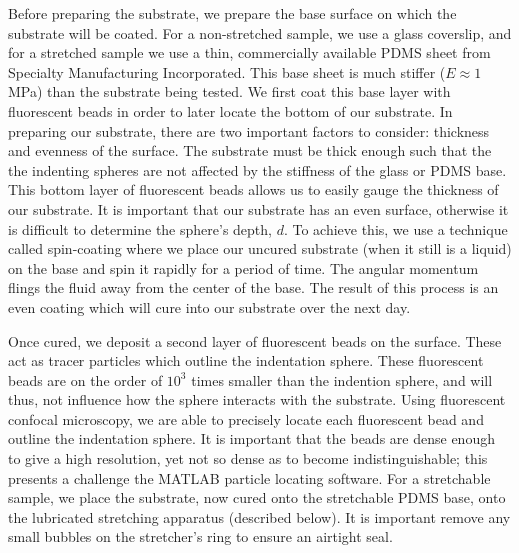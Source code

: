 Before preparing the substrate, we prepare the base surface on which the substrate will be coated. For a non-stretched sample, we use a glass coverslip, and for a stretched sample we use a thin, commercially available PDMS sheet from Specialty Manufacturing Incorporated. This base sheet is much stiffer ($ E\approx 1 $ MPa) than the substrate being tested. We first coat this base layer with fluorescent beads in order to later locate the bottom of our substrate. In preparing our substrate, there are two important factors to consider: thickness and evenness of the surface. The substrate must be thick enough such that the the indenting spheres are not affected by the stiffness of the glass or PDMS base. This bottom layer of fluorescent beads allows us to easily gauge the thickness of our substrate. It is important that our substrate has an even surface, otherwise it is difficult to determine the sphere's depth, $ d $. To achieve this, we use a technique called spin-coating where we place our uncured substrate (when it still is a liquid) on the base and spin it rapidly for a period of time. The angular momentum  flings the fluid away from the center of the base. The result of this process is an even coating which will cure into our substrate over the next day.

Once cured, we deposit a second layer of fluorescent beads on the surface. These act as tracer particles which outline the indentation sphere. These fluorescent beads are on the order of $ 10^3 $ times smaller than the indention sphere, and will thus, not influence how the sphere interacts with the substrate. Using fluorescent confocal microscopy, we are able to precisely locate each fluorescent bead and outline the indentation sphere. It is important that the beads are dense enough to give a high resolution, yet not so dense as to become indistinguishable; this presents a challenge the MATLAB particle locating software. For a stretchable sample, we place the substrate, now cured onto the stretchable PDMS base, onto the lubricated stretching apparatus (described below). It is important remove any small bubbles on the stretcher's ring to ensure an airtight seal. 

